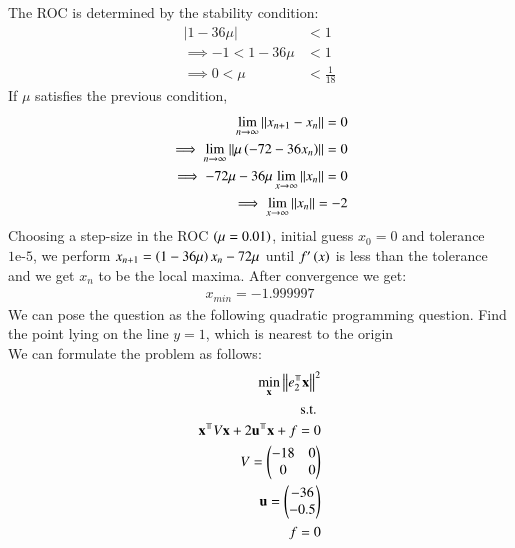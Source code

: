 \documentclass[journal]{IEEEtran}
\begin{document}
The ROC is determined by the stability condition:
\begin{align}
    |1 - 36\mu| &< 1 \\
    \implies -1 < 1 - 36\mu &< 1 \\
    \implies 0 < \mu &< \frac{1}{18}
\end{align}
If $\mu$ satisfies the previous condition,
\begin{align}
    \lim_{n\rightarrow\infty}\left\lVert x_{n+1}-x_n\right\rVert=0\\
    \implies \lim_{n\rightarrow\infty}\left\lVert\mu\left(-72-36x_n\right)\right\rVert=0\\
    \implies -72\mu-36\mu\lim_{x\rightarrow\infty}\left\lVert x_n\right\rVert=0\\
    \implies \lim_{x\rightarrow\infty}\left\lVert x_n\right\rVert=-2
\end{align}
Choosing a step-size in the ROC $\left(\mu=0.01\right)$, initial guess $x_0=0$ and tolerance $1\text{e-}5$, we perform $x_{n+1}=\left(1-36\mu\right)x_n-72\mu$ until $f^\prime\left(x\right)$ is less than the tolerance and we get $x_n$ to be the local maxima. After convergence we get:
\begin{align}
    x_{min}=-1.999997
\end{align}
We can pose the question as the following quadratic programming question. Find the point lying on the line $y=1$, which is nearest to the origin\\
We can formulate the problem as follows:
\begin{align}
    \min_{\vec{x}} \norm{e_2^{\Top}\vec{x}}^2\\
    \text{s.t. } \\ \vec{x}^{\Top}V\vec{x} + 2\vec{u}^{\Top}\vec{x} + f = 0\\
    V = \myvec{-18 & 0 \\ 0 & 0}\\
    \vec{u} = \myvec{-36 \\ -0.5}\\
    f = 0
\end{align}
\end{document}
